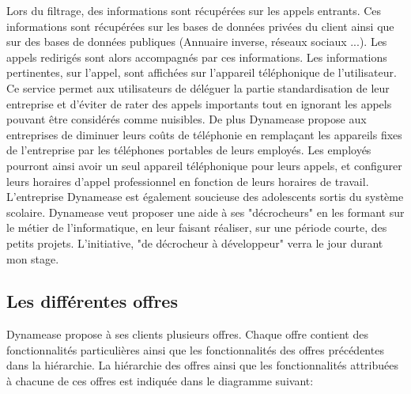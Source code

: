 Lors du filtrage, des informations sont récupérées sur les appels entrants. Ces informations sont récupérées sur les bases de données privées du client ainsi que sur des bases de données publiques (Annuaire inverse, réseaux sociaux ...). Les appels redirigés sont alors accompagnés par ces informations. Les informations pertinentes, sur l'appel, sont affichées sur l'appareil téléphonique de l'utilisateur.\\

Ce service permet aux utilisateurs de déléguer la partie standardisation de leur entreprise et d'éviter de rater des appels importants tout en ignorant les appels pouvant être considérés comme nuisibles. De plus Dynamease propose aux entreprises de diminuer leurs coûts de téléphonie en remplaçant les appareils fixes de l'entreprise par les téléphones portables de leurs employés. Les employés pourront ainsi avoir un seul appareil téléphonique pour leurs appels, et configurer leurs horaires d'appel professionnel en fonction de leurs horaires de travail.\\

L'entreprise Dynamease est également soucieuse des adolescents sortis du système scolaire. Dynamease veut proposer une aide à ses "décrocheurs" en les formant sur le métier de l'informatique, en leur faisant réaliser, sur une période courte, des petits projets. L'initiative, "de décrocheur à développeur" verra le jour durant mon stage.

\subsection{Les différentes offres}

Dynamease propose à ses clients plusieurs offres. Chaque offre contient des fonctionnalités particulières ainsi que les fonctionnalités des offres précédentes dans la hiérarchie.  La hiérarchie des offres ainsi que les fonctionnalités attribuées à chacune de ces offres est indiquée dans le diagramme suivant:


